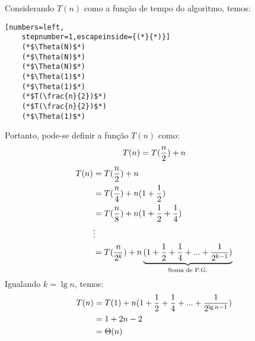 \documentclass[12pt,a4paper]{article}
\begin{document}
Considerando $T(n)$ como a função de tempo do algoritmo, temos:


\begin{lstlisting}[numbers=left,
    stepnumber=1,escapeinside={(*}{*)}]
    (*$\Theta(N)$*)
    (*$\Theta(N)$*)
    (*$\Theta(N)$*)
    (*$\Theta(1)$*)
    (*$\Theta(1)$*)
    (*$T(\frac{n}{2})$*)
    (*$T(\frac{n}{2})$*)
    (*$\Theta(1)$*)

\end{lstlisting}

Portanto, pode-se definir a função $T(n)$ como:
\begin{equation}
    T(n) = T(\frac{n}{2}) + n
    \notag
\end{equation}
\begin{equation}
    \begin{split}
        T(n) &= T(\frac{n}{2}) + n \\
        &= T(\frac{n}{4}) + n(1+\frac{1}{2}) \\
        &= T(\frac{n}{8}) + n(1 +\frac{1}{2} + \frac{1}{4}) \\
        &\vdots\\
        &= T(\frac{n}{2^k}) + n\underbrace{(1+\frac{1}{2}+\frac{1}{4} + ... + \frac{1}{2^{k-1}})}_{\text{Soma de P.G.}}
    \end{split}
    \notag
\end{equation}
Igualando $k = \lg n$, temos:
\begin{equation}
    \begin{split}
    T(n) &= T(1) + n(1+\frac{1}{2}+\frac{1}{4} + ... + \frac{1}{2^{\lg n -1}}) \\
        &= 1+ 2n - 2 \\
        &= \Theta(n)
    \end{split}
    \notag
\end{equation}
\end{document}
